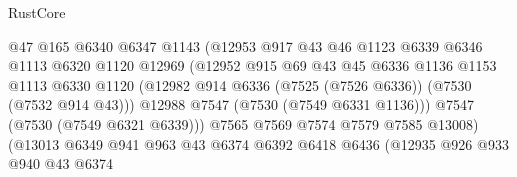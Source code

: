 \begin{lexlean}{RustCore}
\begin{coremodule}
                                    @47
                                    @165
                                    @6340
                                    @6347
                                    @1143
                                    (@12953
                                      @917
                                      @43
                                      @46
                                      @1123
                                      @6339
                                      @6346
                                      @1113
                                      @6320
                                      @1120
                                      @12969
                                      (@12952
                                        @915
                                        @69
                                        @43
                                        @45
                                        @6336
                                        @1136
                                        @1153
                                        @1113
                                        @6330
                                        @1120
                                        (@12982
                                          @914
                                          @6336
                                          (@7525 (@7526 @6336))
                                          (@7530 (@7532 @914 @43)))
                                        @12988
                                        @7547
                                        (@7530 (@7549 @6331 @1136)))
                                      @7547
                                      (@7530 (@7549 @6321 @6339)))
                                    @7565
                                    @7569
                                    @7574
                                    @7579
                                    @7585
                                    @13008)
                                  (@13013
                                    @6349
                                    @941
                                    @963
                                    @43
                                    @6374
                                    @6392
                                    @6418
                                    @6436
                                    (@12935
                                      @926
                                      @933
                                      @940
                                      @43
                                      @6374

\end{coremodule}
\end{lexlean}

